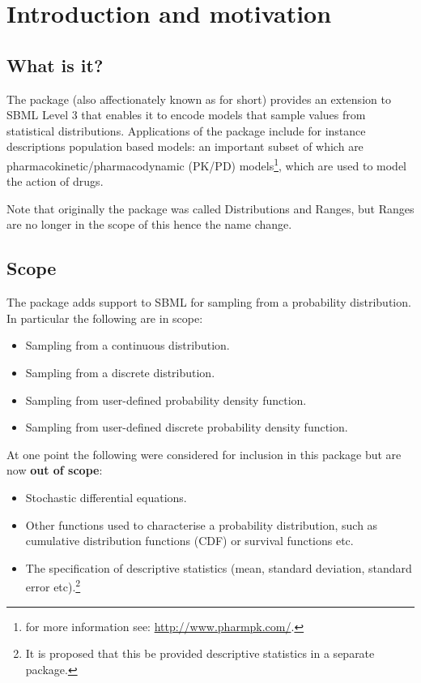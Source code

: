 \documentclass[draftspec]{sbmlpkgspec}
\begin{document}
\section{Introduction and motivation}

\subsection{What is it?}

The \distrib package (also affectionately known as \distribshort for
short) provides an extension to SBML Level 3 that enables it to encode
models that sample values from statistical distributions. Applications
of the package include for instance descriptions population based
models: an important subset of which are
pharmacokinetic/pharmacodynamic (PK/PD) models\footnote{for more
  information see: \url{http://www.pharmpk.com/}.}, which are used to
model the action of drugs.

Note that originally the package was called Distributions and Ranges,
but Ranges are no longer in the scope of this hence the name change.

\subsection{Scope}

The \distrib package adds support to SBML for sampling from a
probability distribution. In particular the following are in scope:

\begin{itemize}
\item Sampling from a continuous distribution.
\item Sampling from a discrete distribution.
\item Sampling from user-defined probability density function.
\item Sampling from user-defined discrete probability density function.
\end{itemize}

At one point the following were considered for inclusion in this
package but are now \textbf{out of scope}:

\begin{itemize}
\item Stochastic differential equations.
\item Other functions used to characterise a probability distribution,
  such as cumulative distribution functions (CDF) or survival functions etc.
\item The specification of descriptive statistics (mean, standard deviation, standard error etc).\footnote{It is proposed that this be provided
    descriptive statistics in a separate package.}
\end{itemize}
\end{document}
